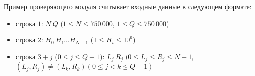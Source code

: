 Пример проверяющего модуля считывает входные данные в следующем формате:
\begin{itemize}
    \item строка $1$: $N\ Q$ ($1\le N \le 750\,000$, $1\le Q \le 750\,000$)
\item строка $2$: $H_0\ H_1\ldots H_{N-1}$ ($1\le H_i \le 10^9$)
\item строка $3 + j$ ($0\le j\le Q-1$): $L_j\ R_j$ ($0 \le L_j \le R_j \le N -1$, $(L_j, R_j) \ne (L_k, R_k) (0\le j < k \le Q-1)$
\end{itemize}


